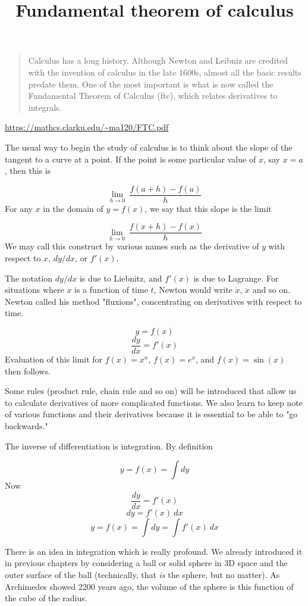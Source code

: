 \documentclass[11pt, oneside]{article}
\title{Fundamental theorem of calculus}
\date{}
\begin{document}
\maketitle
\Large

\begin{quote}Calculus has a long history. Although Newton and Leibniz are credited with the invention of calculus in the late 1600s, almost all the basic results predate them. One of the most important is what is now called the Fundamental Theorem of Calculus (ftc), which relates derivatives to integrals.\end{quote}

\url{https://mathcs.clarku.edu/~ma120/FTC.pdf}

The usual way to begin the study of calculus is to think about the slope of the tangent to a curve at a point.  If the point is some particular value of $x$, say $x=a$, then this is

\[ \lim_{h \rightarrow 0} \ \frac{f(a + h) - f(a)}{h} \]
For any $x$ in the domain of $y=f(x)$, we say that this slope is the limit

\[ \lim_{h \rightarrow 0} \ \frac{f(x + h) - f(x)}{h} \]
We may call this construct by various names such as the derivative of $y$ with respect to $x$, $dy/dx$, or $f'(x)$.  

The notation $dy/dx$ is due to Liebnitz, and $f'(x)$ is due to Lagrange.  For situations where $x$ is a function of time $t$, Newton would write $\dot{x}$, $\ddot{x}$ and so on.  Newton called his method "fluxions", concentrating on derivatives with respect to time.

\[ y = f(x) \]
\[ \frac{dy}{dx} = f'(x) \]
Evaluation of this limit for $f(x) = x^n$, $f(x) = e^x$, and $f(x) = \sin(x)$ then follows.  

Some rules (product rule, chain rule and so on) will be introduced that allow us to calculate derivatives of more complicated functions.  We also learn to keep note of various functions and their derivatives because it is essential to be able to "go backwards."

The inverse of differentiation is integration.  By definition

\[ y = f(x) = \int dy \]
Now
\[ \frac{dy}{dx} = f'(x) \]
\[ dy = f'(x) \ dx \]
\[ y = f(x) = \int dy = \int f'(x) \ dx \]

There is an idea in integration which is really profound.  We already introduced it in previous chapters by considering a ball or solid sphere in 3D space and the outer surface of the ball (technically, that \emph{is} the sphere, but no matter).  As Archimedes showed 2200 years ago, the volume of the sphere is this function of the cube of the radius.
\end{document}
